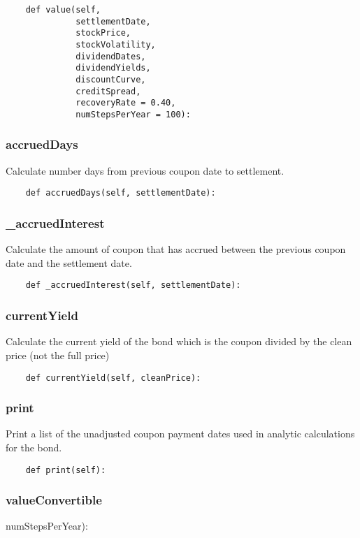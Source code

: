 \documentclass[twoside,11pt]{book}
\begin{document}
\begin{lstlisting}
    def value(self,
              settlementDate,
              stockPrice,
              stockVolatility,
              dividendDates,
              dividendYields,
              discountCurve,
              creditSpread,
              recoveryRate = 0.40,
              numStepsPerYear = 100):
\end{lstlisting}

\subsubsection*{{\bf accruedDays}}
Calculate number days from previous coupon date to settlement. 

\begin{lstlisting}
    def accruedDays(self, settlementDate):
\end{lstlisting}

\subsubsection*{{\bf \_accruedInterest}}
Calculate the amount of coupon that has accrued between the previous coupon date and the settlement date.  

\begin{lstlisting}
    def _accruedInterest(self, settlementDate):
\end{lstlisting}

\subsubsection*{{\bf currentYield}}
Calculate the current yield of the bond which is the coupon divided by the clean price (not the full price) 

\begin{lstlisting}
    def currentYield(self, cleanPrice):
\end{lstlisting}

\subsubsection*{{\bf print}}
Print a list of the unadjusted coupon payment dates used in analytic calculations for the bond.  

\begin{lstlisting}
    def print(self):
\end{lstlisting}

\subsubsection*{{\bf valueConvertible}}
numStepsPerYear): 
\end{document}
